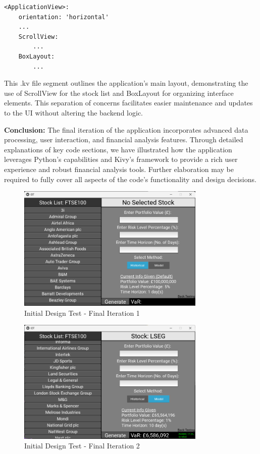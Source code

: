 \documentclass{article}
\begin{document}
\begin{verbatim}
<ApplicationView>:
    orientation: 'horizontal'
    ...
    ScrollView:
        ...
    BoxLayout:
        ...
\end{verbatim}

This .kv file segment outlines the application's main layout, demonstrating the use of ScrollView for the stock list and BoxLayout for organizing interface elements. This separation of concerns facilitates easier maintenance and updates to the UI without altering the backend logic.

\textbf{Conclusion:}
The final iteration of the application incorporates advanced data processing, user interaction, and financial analysis features. Through detailed explanations of key code sections, we have illustrated how the application leverages Python's capabilities and Kivy's framework to provide a rich user experience and robust financial analysis tools. Further elaboration may be required to fully cover all aspects of the code's functionality and design decisions.

\begin{figure}[h!]
  \centering
  \includegraphics[width=0.8\textwidth]{Images/Initial Design Tes - Final Iteration 1.png}
  \caption{Initial Design Test - Final Iteration 1}
  \label{fig:Initial Design Test - Final Iteration 1}
\end{figure}

\begin{figure}[h!]
  \centering
  \includegraphics[width=0.8\textwidth]{Images/Initial Design Tes - Final Iteration 2.png}
  \caption{Initial Design Test - Final Iteration 2}
  \label{fig:Initial Design Test - Final Iteration 2}
\end{figure}
\end{document}
